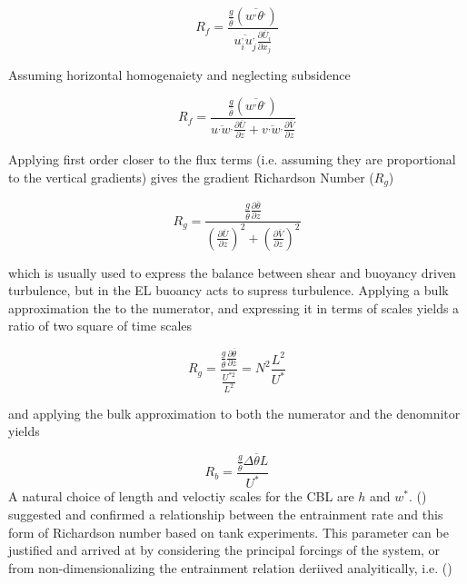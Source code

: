 \begin{equation}
R_{f} = \frac{\frac{g}{\overline{\theta}} \left( \overline{w^{,}\theta^{,}} \right)}{\overline{u_{i}^{,}u_{j}^{,}}\frac{\partial \overline{U}_{i}}{\partial x_{j}}}
\end{equation}
 
Assuming horizontal homogenaiety and neglecting subsidence
  
\begin{equation}
R_{f} = \frac{\frac{g}{\overline{\theta}} \left( \overline{w^{,}\theta^{,}} \right)}{\overline{u^{,}w^{,}}\frac{\partial \overline{U}}{\partial z} + \overline{v^{,}w^{,}}\frac{\partial \overline{V}}{\partial z}}
\end{equation}

Applying first order closer to the flux terms (i.e. assuming they are proportional to the vertical gradients)  gives the gradient Richardson Number ($R_{g}$)

\begin{equation}
R_{g} = \frac{ \frac{g}{\overline{\theta}} \frac{\partial \overline{\theta}}{\partial z}}{\left( \frac{ \partial \overline{U}}{\partial z} \right)^{2} + \left( \frac{\partial \overline{V}}{\partial z} \right)^{2}} 
\end{equation}

which is usually used to express the balance between shear and buoyancy driven turbulence, but in the \acs{EL} buoancy acts to supress turbulence.  
Applying a bulk approximation the to the numerator, and expressing it in terms of scales yields a ratio of two square of time scales

\begin{equation}
R_{g} = \frac{\frac{g}{\overline{\theta}} \frac{\partial \overline{\theta}}{\partial z}}{\frac{U^{*2}}{L^{2}}} = N^{2}\frac{L^{2}}{U^{*}}
\end{equation}


and applying the bulk approximation to both the numerator and the denomnitor yields

\begin{equation}
R_{b} = \frac{\frac{g}{\overline{\theta}} \Delta \overline{\theta} L}{U^{*}}
\end{equation}
A natural choice of length and veloctiy scales for the \acs{CBL} are $h$ and $w^{*}$.  \citeauthor{EllTurn} (\cite{EllTurn}) suggested and confirmed a relationship between the entrainment rate and this form of 
Richardson number based on tank experiments.  This parameter can be justified and arrived at by considering the principal forcings of the system, or from non-dimensionalizing the entrainment relation  deriived
analyitically, i.e. (\cite{Deardorff72})

